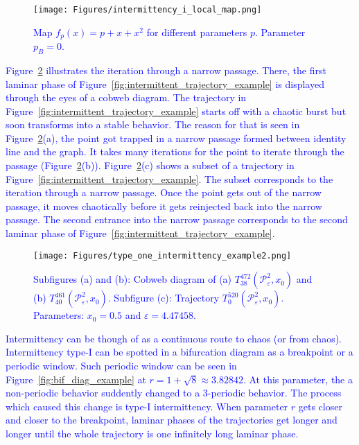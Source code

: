 \begin{figure}[!h]
    \centering
    \texttt{[image: Figures/intermittency\_i\_local\_map.png]}
    \caption{
        \textcolor{blue}{
        Map $f_{p}(x) = p + x + x^2$ for different parameters $p$. 
        Parameter $p_B = 0$.
        }
    }
    \label{fig:saddle_node_bifurcation}
\end{figure}

\par
\textcolor{blue}{
Figure~\ref{fig:intermittent_cobweb_example} illustrates the iteration through a narrow passage.
There, the first laminar phase of Figure~\ref{fig:intermittent_trajectory_example} is displayed through the eyes of a cobweb diagram.
The trajectory in Figure~\ref{fig:intermittent_trajectory_example} starts off with a chaotic burst but soon transforms into a stable behavior.
The reason for that is seen in Figure~\ref{fig:intermittent_cobweb_example}(a), the point got trapped in a narrow passage formed between identity line and the graph.
It takes many iterations for the point to iterate through the passage (Figure~\ref{fig:intermittent_cobweb_example}(b)).
Figure~\ref{fig:intermittent_cobweb_example}(c) shows a subset of a trajectory in Figure~\ref{fig:intermittent_trajectory_example}.
The subset corresponds to the iteration through a narrow passage.
Once the point gets out of the narrow passage, it moves chaotically before it gets reinjected back into the narrow passage.
The second entrance into the narrow passage corresponds to the second laminar phase of Figure~\ref{fig:intermittent_trajectory_example}.
}

\begin{figure}[!h]
    \centering
    \texttt{[image: Figures/type\_one\_intermittency\_example2.png]}
    \caption{
        \textcolor{blue}{
        Subfigures (a) and (b):
        Cobweb diagram of 
        (a) $T^{472}_{38}(\mathcal{P}_{\varepsilon}^{2}, x_0)$ and
        (b) $T^{461}_{40}(\mathcal{P}_{\varepsilon}^{2}, x_0)$. 
        Subfigure (c):
        Trajectory $T^{520}_{0}(\mathcal{P}_{\varepsilon}^{2}, x_0)$.
        Parameters: $x_0 = 0.5$ and $\varepsilon = 4.47458$.
        }
    }
    \label{fig:intermittent_cobweb_example}
\end{figure}

\par
\textcolor{blue}{
Intermittency can be though of as a continuous route to chaos (or from chaos).
Intermittency type-I can be spotted in a bifurcation diagram as a breakpoint or a periodic window.
Such periodic window can be seen in Figure~\ref{fig:bif_diag_example} at $r = 1+\sqrt{8} \approx 3.82842$.
At this parameter, the a non-periodic behavior suddently changed to a $3$-periodic behavior.
The process which caused this change is type-I intermittency.
When parameter $r$ gets closer and closer to the breakpoint, laminar phases of the trajectories get longer and longer until the whole trajectory is one infinitely long laminar phase.
}


